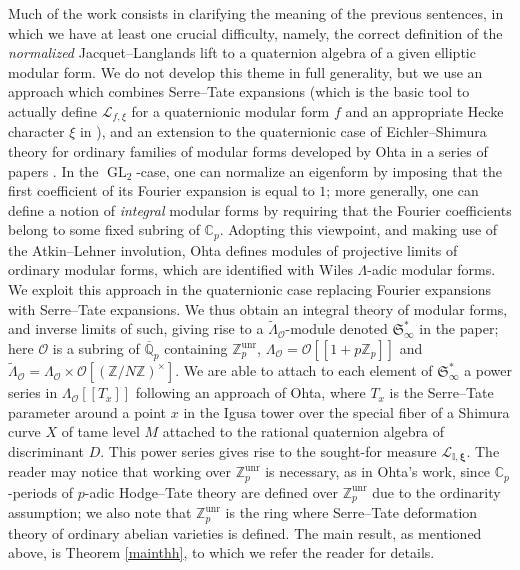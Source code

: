 \documentclass[a4paper,11pt]{amsart}
\numberwithin{equation}{section}
\theoremstyle{plain}
\theoremstyle{definition}
\theoremstyle{remark}
\newcommand{\Q}{\mathbb{Q}}
\newcommand{\Z}{\mathbb{Z}}
\newcommand{\C}{\mathbb{C}}
\newcommand{\I}{\mathbb{I}}
\DeclareMathOperator{\GL}{GL}
\newcommand{\unr}{\mathrm{unr}}
\begin{document}
Much of the work consists in clarifying the meaning of the previous sentences, in which we have at least one crucial difficulty, namely, the correct definition of the \emph{normalized} Jacquet--Langlands lift to a quaternion algebra of a given elliptic modular form. 
We do not develop this theme in full generality, 
but we use an approach which combines Serre--Tate expansions (which is the basic tool to actually define $\mathscr{L}_{f,\xi}$ for a quaternionic modular form $f$ and an appropriate Hecke character $\xi$ in
\cite{Burungale, Magrone, Mori1}), and an extension to the quaternionic case of Eichler--Shimura theory for ordinary families of modular forms developed by Ohta in a series of papers \cite{OhtaJ, Ohta-ES, OhtaC, OhtaMA}. In the $\GL_2$-case, one can normalize an eigenform by imposing that the first coefficient of its Fourier expansion is equal to $1$; more generally, one can define a notion of \emph{integral} modular forms by requiring that the Fourier coefficients belong to some fixed subring of $\C_p$. Adopting this viewpoint, and making use of the Atkin--Lehner involution, Ohta defines modules of projective limits of ordinary modular forms, which are identified with Wiles $\Lambda$-adic modular forms. 
We exploit this approach in the quaternionic case replacing Fourier expansions with Serre--Tate expansions. We thus obtain an integral theory of modular forms, and inverse limits of such, giving rise to a $\widetilde{\Lambda}_\mathcal{O}$-module denoted $\mathfrak{S}_\infty^*$ in the paper; here $\mathcal{O}$ is a subring of $\overline{\Q}_p$ containing $\Z_p^\unr$, $\Lambda_\mathcal{O}=\mathcal{O}[[1+p\Z_p]]$ and $\widetilde{\Lambda}_\mathcal{O}=\Lambda_\mathcal{O}\times\mathcal{O}[(\Z/N\Z)^\times]$.
We are able to attach to each element of $\mathfrak{S}_\infty^*$ a power series in $\Lambda_\mathcal{O}[[T_x]]$ following an approach of Ohta, where $T_x$ is the Serre--Tate parameter around a point $x$ in the Igusa tower over the special fiber of a Shimura curve $X$ of tame level $M$ attached to the rational quaternion algebra of discriminant $D$. This power series gives rise to the sought-for measure $\mathscr{L}_{\I,\boldsymbol{\xi}}$. The reader may notice that
working over $\Z_p^\unr$ is necessary, as in Ohta's work, since $\C_p$-periods of $p$-adic Hodge--Tate theory are 
defined over $\Z_p^\unr$ due to the ordinarity assumption; we also note that $\Z_p^\unr$ 
is the ring where Serre--Tate deformation theory
of ordinary abelian varieties is defined. The main result, as mentioned above, is Theorem \ref{mainthh}, to which we refer the reader for details.
\end{document}

